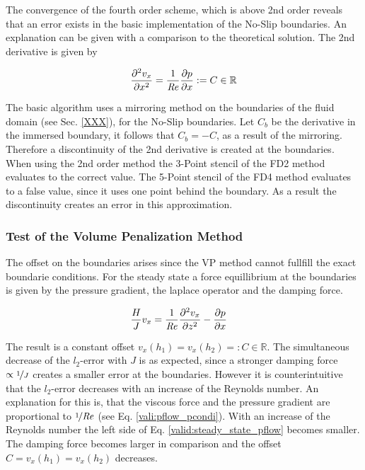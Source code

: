 The convergence of the fourth order scheme, which is above 2nd order
reveals that an error exists in the basic implementation of the No-Slip boundaries.
An explanation can be given with a comparison to the theoretical solution.
The 2nd derivative is given by

\begin{align}
    \pdn[^2 v_x]{x^2} = \frac{1}{\Rey}\pdn[p]{x} := C\in\mathbb{R}
\end{align}

The basic algorithm uses a mirroring method on the boundaries of the fluid domain (see Sec. \ref{XXX}), for the No-Slip boundaries.
Let $C_b$ be the derivative in the immersed boundary, it follows that $C_b = - C$, as a result of the mirroring.
Therefore a discontinuity of the 2nd derivative is created at the boundaries.
When using the 2nd order method the 3-Point stencil of the FD2 method evaluates to the correct value.
The 5-Point stencil of the FD4 method evaluates to a false value, since it uses one point behind the boundary.
As a result the discontinuity creates an error in this approximation.

\clearpage

\subsubsection{Test of the Volume Penalization Method}

The offset on the boundaries arises since the VP method cannot fullfill the exact boundarie conditions.
For the steady state a force equillibrium at the boundaries is given by the pressure gradient, the laplace operator and the damping force.

\begin{align}
\label{valid:steady_state_pflow}
 \frac{H}{J} v_x &=  \frac{1}{\Rey}\frac{\partial^2 v_x}{\partial z^2} -\pdn[p]{x}
\end{align}

The result is a constant offset $v_x(h_1) = v_x(h_2) =: C\in\mathbb{R}$.
The simultaneous decrease of the $l_2$-error with $J$ is as expected, since a stronger damping force $\propto \nicefrac{1}{J}$ creates a smaller
error at the boundaries.
However it is counterintuitive that the $l_2$-error decreases with an increase of the Reynolds number.
An explanation for this is, that the viscous force and the pressure gradient are proportional to $\nicefrac{1}{\Rey}$
(see Eq. \ref{vali:pflow_pcondi}).
With an increase of the Reynolds number the left side of Eq. \ref{valid:steady_state_pflow} becomes smaller.
The damping force becomes larger in comparison and the  offset $C=v_x(h_1)=v_x(h_2)$ decreases.

